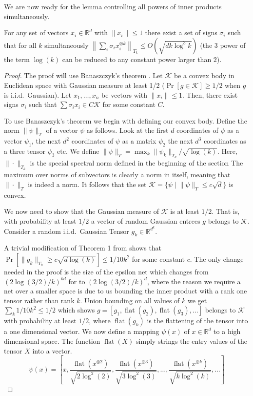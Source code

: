 \documentclass[anon,12pt]{colt2019} %
\newcommand{\R}{\mathbb{R}}
\renewcommand{\Pr}{\operatorname{Pr}}
\begin{document}
We are now ready for the lemma controlling all powers of inner products simultaneously. 

\begin{lemma}\label{uc}
For any set of vectors $x_i \in \R^d$ with $\|x_i\| \leq 1$ there exist a set of signs $\sigma_i$ such that for all $k$ simultaneously $\left\| \sum_i \sigma_i x_i^{\otimes k} \right\|_{T_k} \le O(\sqrt{d k\log^{3}{k}})$ (the $3$ power of the term $\log(k)$ can be reduced to any constant power larger than $2$). 
\end{lemma}
\begin{proof}
The proof will use Banaszczyk's theorem \cite{Banaszczyk}. 
Let $\mathcal K$ be a convex body in Euclidean space with Gaussian measure at least 1/2 ($\Pr[g \in \mathcal K] \ge 1/2$ when $g$ is i.i.d.\ Gaussian).
Let $x_1,\ldots,x_n$ be vectors with $\|x_i\| \leq 1$. 
Then, there exist signs $\sigma_i$ such that $\sum \sigma_i x_i \in C \mathcal K$ for some constant $C$.

To use Banaszczyk's theorem we begin with defining our convex body.
Define the norm $\|\psi\|_T$ of a vector $\psi$ as follows. Look at the first $d$ coordinates of $\psi$ as a vector $\psi_1$, the next $d^2$ coordinates of $\psi$ as a matrix $\psi_2$ the next $d^3$ coordinates as a three tensor $\psi_3$ etc.
We define $\|\psi\|_T = \max_k \|\psi_k\|_{T_k} /\sqrt{\log(k)}$. 
Here, $\|\cdot\|_{T_k}$ is the special spectral norm defined in the beginning of the section 
The maximum over norms of subvectors is clearly a norm in itself, meaning that $\|\cdot \|_T$ is indeed a norm. It follows that  the set $\mathcal K  = \{\psi \; | \; \|\psi\|_T \le c\sqrt{d}\}$ is convex. 

We now need to show that the Gaussian measure of $\mathcal K$ is at least $1/2$. 
That is, with probability at least $1/2$ a vector of random Gaussian entrees $g$ belongs to $\mathcal K$.
Consider a random i.i.d.\ Gaussian Tensor $g_k \in \R^{d^k}$. 

A trivial modification of Theorem 1 from \cite{tomioka2014spectral} shows that $\Pr[\|g_k\|_{T_k} \ge c\sqrt{d\log(k)}] \le 1/10k^2$ for some constant $c$. The only change needed in the proof is the size of the epsilon net which changes from $(2\log(3/2)/k)^{kd}$ for \cite{tomioka2014spectral} to $(2\log(3/2)/k)^d$, where the reason we require a net over a smaller space is due to us bounding the inner product with a rank one tensor rather than rank $k$. Union bounding on all values of $k$ we get $\sum_k 1/10k^2 \le 1/2$ which shows $g = [g_1, \operatorname{flat}(g_2), \operatorname{flat}(g_3), \ldots]$ belongs to $\mathcal K$ with probability at least $1/2$, where $\operatorname{flat}(g_k)$ is the flattening of the tensor into a one dimensional vector. 
%
We now define a mapping $\psi(x)$ of $x\in \R^d$ to a high dimensional space. The function $\operatorname{flat}(X)$ simply strings the entry values of the tensor $X$ into a vector.
$$\psi(x) = \left[x, \frac{\operatorname{flat}(x^{\otimes 2})}{\sqrt{2\log^2(2)}}, \frac{\operatorname{flat}(x^{\otimes 3})}{\sqrt{3\log^2(3)}}, \ldots,\frac{\operatorname{flat}(x^{\otimes k})}{\sqrt{k\log^2(k)}},\ldots \right]$$


\end{proof}
\end{document}
